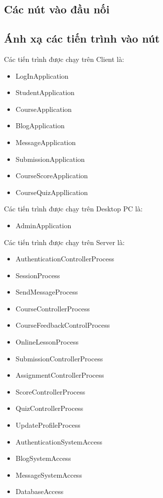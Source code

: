 \documentclass[./../main.tex]{subfiles}
\begin{document}
\subsection{Các nút vào đầu nối}
\subsection{Ánh xạ các tiến trình vào nút}
Các tiến trình được chạy trên Client là:
\begin{itemize}
	\item LogInApplication
	\item StudentApplication
	\item CourseApplication
	\item BlogApplication
	\item MessageApplication
	\item SubmissionApplication
	\item CourseScoreApplication
	\item CourseQuizAppllication
\end{itemize}
Các tiến trình được chạy trên Desktop PC là:
\begin{itemize}
	\item AdminApplication
\end{itemize}

Các tiến trình được chạy trên Server là:
\begin{itemize}
	\item AuthenticationControllerProcess
	\item SessionProcess
	\item SendMessageProcess
	\item CourseControllerProcess
	\item CourseFeedbackControlProcess
	\item OnlineLessonProcess
	\item SubmissionControllerProcess
	\item AssignmentControllerProcess
	\item ScoreControllerProcess
	\item QuizControllerProcess
	\item UpdateProfileProcess
	\item AuthenticationSystemAccess
	\item BlogSystemAccess
	\item MessageSystemAccess
	\item DatabaseAccess
\end{itemize}
\end{document}
